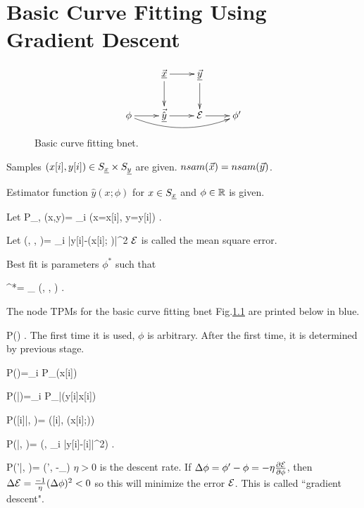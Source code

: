 \chapter{Basic Curve Fitting
Using Gradient Descent}
\label{chap-basic-fit}

\begin{figure}[h!]
\centering
$$\xymatrix{
&\vec{\rvx}\ar[d]\ar[r]&\ul{\vecy}
\ar[d]&\\
\phi\ar[r]\ar@/_1pc/[rrr]&
\vec{\hat{\rvy}}\ar[r]&\cale\ar[r]&\phi'
}$$
\caption{Basic curve fitting bnet.}
\label{fig-bfit}
\end{figure}


Samples 
$(x[i], y[i])\in S_{\underline{x}}\times S_{\underline{y}}$
are given. $nsam({\vec{x}})=nsam({\vec{y}})$.

Estimator function 
$\hat{y}(x; \phi)$
for $x\in S_{\underline{x}}$ and $\phi\in{ \mathbb{R}}$
is given.

Let 
\beq
P_{\rvx, \rvy}(x,y)=
\sum_i \indi(x=x[i], y=y[i])
\;.
\eeq


Let 
\beq
\cale(\vecx, \vecy, \phi)=
\sum_i
|y[i]-(x[i]; \phi)|^2
\;
\eeq
${\cal E}$ is called the mean square error.

Best fit is parameters $\phi^*$
such that

\beq 
\phi^*= \argmin_\phi
\cale(\vecx, \vecy, \phi)
\;.
\eeq

The node TPMs for
the basic curve fitting bnet
 Fig.\ref{fig-bfit} are
printed below in blue.

\beq\color{blue}
P(\phi) 
\;.
\eeq
The first time
it is used, $\phi$ is arbitrary.
After the first time, it is determined 
by previous stage.

\beq\color{blue}
P(\vecx)=\prod_i P_\rvx(x[i])
\eeq

\beq\color{blue}
P(\vecy|\vecx)=\prod_i P_{\rvy|\rvx}(y[i]\cond x[i])
\eeq

\beq\color{blue}
P([i]|\phi, \vecx)=
\delta([i], (x[i];\phi))
\eeq


\beq\color{blue}
P(\cale|, \vecy)=
\delta(\cale,
\sum_i |y[i]-[i]|^2)
\;.
\eeq


\beq\color{blue}
P(\phi'|\phi, \cale)=
\delta(\phi',
\phi-\eta\partial_\phi\cale)
\eeq
$\eta>0$ is the descent rate.
If $\Delta \phi=\phi'-\phi=-\eta 
\frac{\partial{\cal E}}
{\partial \phi}$, then
 $\Delta {\cal E}=\frac{-1}{\eta}
(\Delta\phi)^2<0$  so this will
minimize the error
${\cal E}$.
This is called ``gradient descent".